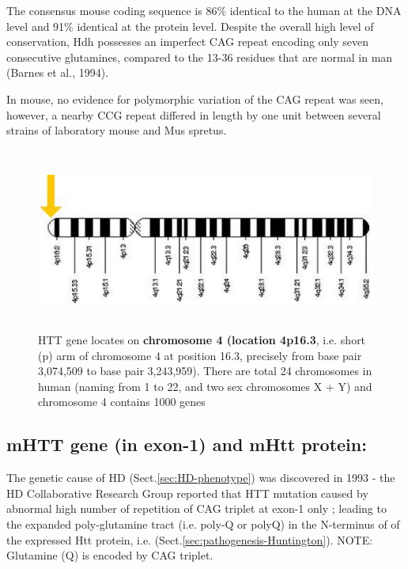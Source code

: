   
The consensus mouse  coding sequence is 86\% identical to the human at the DNA
level and 91\% identical at the protein
level. Despite the overall high level of conservation, Hdh possesses an
imperfect CAG repeat encoding only seven consecutive glutamines, compared to
the 13-36 residues that are normal in man (Barnes et al., 1994).
 
In mouse, no evidence for polymorphic variation of the CAG repeat was seen,
however, a nearby CCG repeat differed in length by one unit between several
strains of laboratory mouse and Mus spretus.
 

\begin{figure}[htbp]
  \centerline{\includegraphics[height=6cm]{./images/chromosome.eps}}
  \caption{HTT gene locates on {\bf chromosome 4 (location 4p16.3}, i.e. short
  (p) arm of chromosome 4 at position 16.3, precisely from base pair 3,074,509
  to base pair 3,243,959). There are total 24 chromosomes in human (naming from
  1 to 22, and two sex chromosomes X + Y) and chromosome 4 contains 1000
  genes}\label{fig:chromosome_4}
\end{figure}

\subsection{mHTT gene (in exon-1) and mHtt protein: }
\label{sec:mHtt-protein}
\label{sec:mHTT-gene}
\label{sec:HD-types}

The genetic cause of HD (Sect.\ref{sec:HD-phenotype}) was discovered in 1993 -
the HD Collaborative Research Group reported that HTT mutation caused by
abnormal high number of repetition of CAG triplet at exon-1 only
\citep{HDgroup1993}; leading to the expanded poly-glutamine tract (i.e. poly-Q
or polyQ)  in the N-terminus of of the expressed Htt protein, i.e.
(Sect.\ref{sec:pathogenesis-Huntington}). NOTE: Glutamine (Q) is encoded by CAG
triplet.

